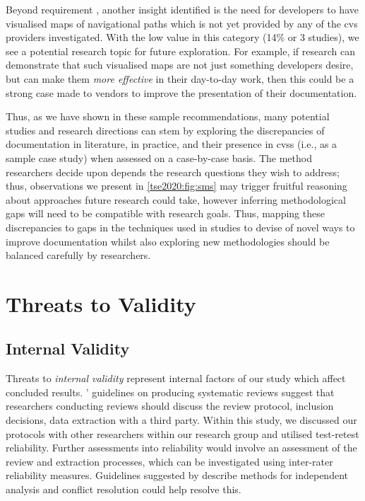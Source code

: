 Beyond requirement , another insight identified is the need for developers to have visualised maps of navigational paths  which is not yet provided by any of the \gls{cvs} providers investigated. With the low  value in this category (14\% or 3 studies), we see a potential research topic for future exploration. For example, if research can demonstrate that such visualised maps are not just something developers desire, but can make them \textit{more effective} in their day-to-day work, then this could be a strong case made to vendors to improve the presentation of their documentation.

Thus, as we have shown in these sample recommendations, many potential studies and research directions can stem by exploring the discrepancies of  documentation in literature, in practice, and their presence in \glspl{cvs} (i.e., as a sample case study) when assessed on a case-by-case basis. The method researchers decide upon depends the research questions they wish to address; thus, observations we present in \cref{tse2020:fig:sms} may trigger fruitful reasoning about approaches future research could take, however inferring methodological gaps will need to be compatible with research goals. Thus, mapping these discrepancies to gaps in the techniques used in studies to devise of novel ways to improve  documentation whilst also exploring new methodologies should be balanced carefully by researchers.

\section{Threats to Validity}
\label{tse2020:sec:limitations}

\subsection{Internal Validity}

Threats to \textit{internal validity} represent internal factors of our study which affect concluded results. \citeauthor{Kitchenham:2007dd}' guidelines on producing systematic reviews \citep{Kitchenham:2007dd} suggest that researchers conducting reviews should discuss the review protocol, inclusion decisions, data extraction with a third party. Within this study, we discussed our protocols with other researchers within our research group and utilised test-retest reliability. Further assessments into reliability would involve an assessment of the review and extraction processes, which can be investigated using inter-rater reliability measures. Guidelines suggested by \citet{Garousi:2017:EGE:3084226.3084238} describe methods for independent analysis and conflict resolution could help resolve this.

